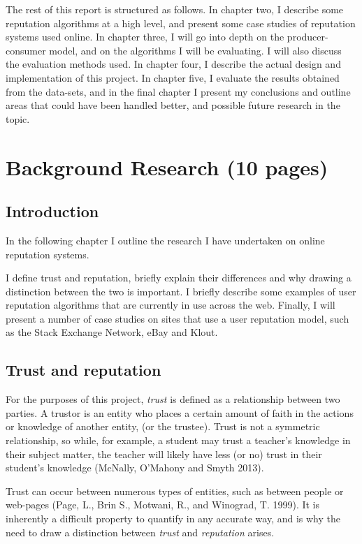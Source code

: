 \documentclass[]{final_report}
\begin{document}
The rest of this report is structured as follows. In chapter two, I describe some reputation algorithms at a high level, and present some case studies of reputation systems used online. In chapter three, I will go into depth on the producer-consumer model, and on the algorithms I will be evaluating. I will also discuss the evaluation methods used. In chapter four, I describe the actual design and implementation of this project. In chapter five, I evaluate the results obtained from the data-sets, and in the final chapter I present my conclusions and outline areas that could have been handled better, and possible future research in the topic.



\chapter{Background Research (10 pages)}

\section{Introduction}

In the following chapter I outline the research I have undertaken on online reputation systems.

I define trust and reputation, briefly explain their differences and why drawing a distinction between the two is important. I  briefly describe some examples of user reputation algorithms that are currently in use across the web. Finally,  I will present a number of case studies on sites that use a user reputation model, such as the Stack Exchange Network, eBay and Klout.


\section{Trust and reputation}

For the purposes of this project, \textsl{trust} is defined as a relationship between two parties. A trustor is an entity who places a certain amount of faith in the actions or knowledge of another entity, (or the trustee). Trust is not a symmetric relationship, so while, for example, a student may trust a teacher's knowledge in their subject matter, the teacher will likely have less (or no) trust in their student's knowledge  (McNally, O'Mahony and Smyth 2013).

Trust can occur between numerous types of entities, such as between people or web-pages (Page, L., Brin S., Motwani, R., and Winograd, T. 1999). It is inherently a difficult property to quantify in any accurate way, and is why the need to draw a distinction between \textsl{trust} and \textsl{reputation} arises.
\end{document}
